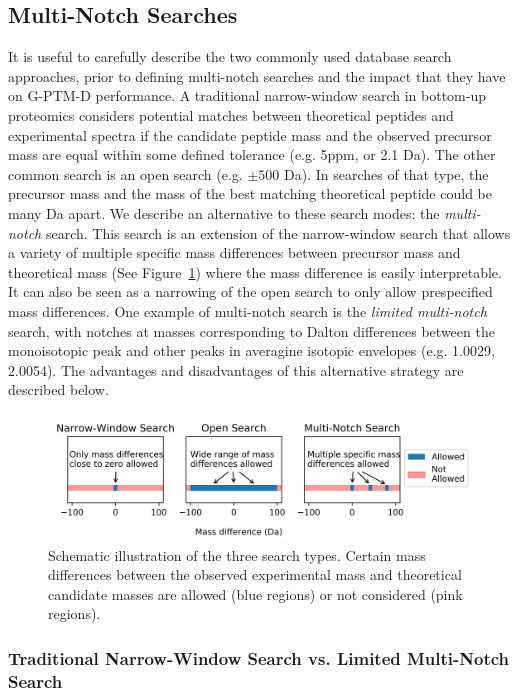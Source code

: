 \documentclass[journal=jprobs,manuscript=article]{achemso}
\begin{document}
\subsection{Multi-Notch Searches}

It is useful to carefully describe the two commonly used database search approaches, prior to defining multi-notch searches and the impact that they have on G-PTM-D performance.
A traditional narrow-window search in bottom-up proteomics considers potential matches between theoretical peptides and experimental spectra if the candidate peptide mass and the observed precursor mass are equal within some defined tolerance (e.g. 5ppm, or 2.1 Da).
The other common search is an open search (e.g. $\pm 500$ Da)\citep{Chick_2015,Kong_2017,Li_2016}.
In searches of that type, the precursor mass and the mass of the best matching theoretical peptide could be many Da apart.
We describe an alternative to these search modes: the \textit{multi-notch} search.
This search is an extension of the narrow-window search that allows a variety of multiple specific mass differences between precursor mass and theoretical mass (See Figure~\ref{fig:fig3-searchTypes}) where the mass difference is easily interpretable.
It can also be seen as a narrowing of the open search to only allow prespecified mass differences.
One example of multi-notch search is the \textit{limited multi-notch} search, with notches at masses corresponding to Dalton differences between the monoisotopic peak and other peaks in averagine\citep{Senko1995} isotopic envelopes (e.g. 1.0029, 2.0054).
The advantages and disadvantages of this alternative strategy are described below.

\begin{figure}[H]
\includegraphics{fig3-searchTypes.png}
\caption{Schematic illustration of the three search types. Certain mass differences between the observed experimental mass and theoretical candidate masses are allowed (blue regions) or not considered (pink regions).}
\label{fig:fig3-searchTypes}
\end{figure}

\subsubsection{Traditional Narrow-Window Search vs. Limited Multi-Notch Search}
\end{document}
